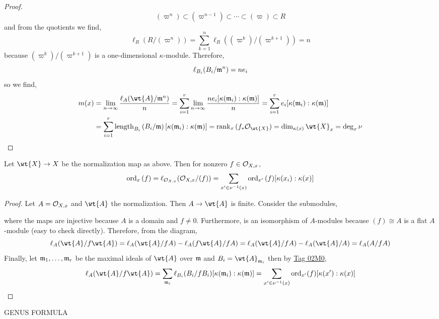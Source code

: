 \documentclass[12pt]{article}
\begin{document}
\begin{proof}
\[ (\varpi^n) \subset (\varpi^{n-1}) \subset \cdots \subset (\varpi) \subset R \]
and from the quotients we find,
\[ \ell_R(R/(\varpi^n)) = \sum_{k = 1}^n \ell_R((\varpi^k)/(\varpi^{k+1})) = n \]
because $(\varpi^k)/(\varpi^{k+1})$ is a one-dimensional $\kappa$-module. Therefore, 
\[ \ell_{B_i}(B_i / \mathfrak{m}^n) = n e_i \]
so we find,
\begin{align*}
m(x) & = \lim_{n \to \infty} \frac{\ell_A(\wt{A} / \m^n)}{n} = \sum_{i = 1}^r \lim_{n \to \infty} \frac{n e_i [\kappa(\m_i) : \kappa(\m)]}{n} = \sum_{i = 1}^r e_i [\kappa(\m_i) : \kappa(\m)] 
\\
& = \sum_{i = 1}^r \length{B_i}{B_i / \m} [\kappa(\m_i) : \kappa(\m)] = \rank_x{(f_* \struct{\wt{X}})} = \dim_{\kappa(x)} \wt{X}_x = \deg_x{\nu}  
\end{align*}
\end{proof}

\begin{prop}
Let $\wt{X} \to X$ be the normalization map as above. Then for nonzero $f \in \mathcal{O}_{X, x}$,
\[ \operatorname{\mathrm{ord}}_x{(f)} = \ell_{\mathcal{O}_{X, x}}(\mathcal{O}_{X, x} / (f)) = \sum_{x' \in \nu^{-1}(x)} \operatorname{\mathrm{ord}}_{x'} {(f)} [\kappa(x_i) : \kappa(x)] \]
\end{prop}

\begin{proof}
Let $A = \mathcal{O}_{X, x}$ and $\wt{A}$ the normalization. Then $A \to \wt{A}$ is finite. Consider the submodules,
\begin{center}
\end{center}
where the maps are injective because $A$ is a domain and $f \neq 0$. Furthermore,
is an isomorphism of $A$-modules because $(f) \cong A$ is a flat $A$-module (easy to check directly). Therefore, from the diagram,
\[ \ell_A(\wt{A}/ f \wt{A}) = \ell_A(\wt{A} / f A) - \ell_A(f \wt{A} / f A) = \ell_A(\wt{A} / f A) - \ell_A(\wt{A} / A) = \ell_A(A / f A) \]
Finally, let $\mathfrak{m}_1, \dots, \mathfrak{m}_r$ be the maximal ideals of $\wt{A}$ over $\mathfrak{m}$ and $B_i = \wt{A}_{\m_i}$ then by \href{https://stacks.math.columbia.edu/tag/02M0}{Tag 02M0},
\[ \ell_A(\wt{A} / f \wt{A}) = \sum_{\m_i} \ell_{B_i}(B_i / f B_i) [\kappa(\m_i) : \kappa(\m)] = \sum_{x' \in \nu^{-1}(x)} \ord_{x'}(f) [\kappa(x') : \kappa(x)] \]
\end{proof}

\begin{prop}
GENUS FORMULA
\end{prop}
\end{document}
